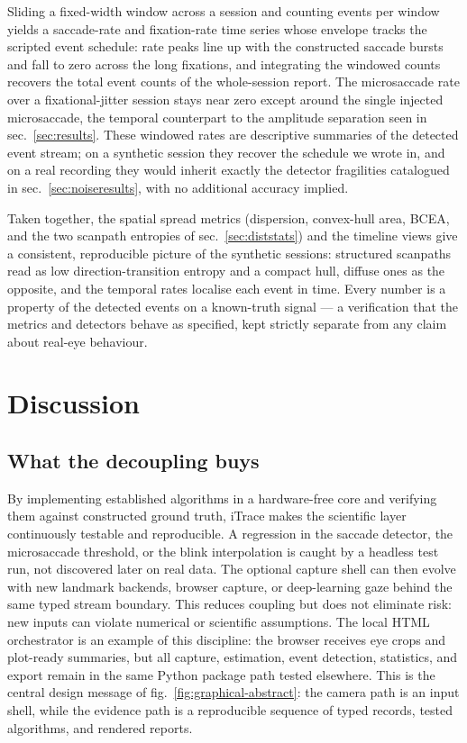 \documentclass[
]{article}
\begin{document}
Sliding a fixed-width window across a session and counting events per
window yields a saccade-rate and fixation-rate time series whose
envelope tracks the scripted event schedule: rate peaks line up with the
constructed saccade bursts and fall to zero across the long fixations,
and integrating the windowed counts recovers the total event counts of
the whole-session report. The microsaccade rate over a fixational-jitter
session stays near zero except around the single injected microsaccade,
the temporal counterpart to the amplitude separation seen in
sec.~\ref{sec:results}. These windowed rates are descriptive summaries
of the detected event stream; on a synthetic session they recover the
schedule we wrote in, and on a real recording they would inherit exactly
the detector fragilities catalogued in sec.~\ref{sec:noiseresults}, with
no additional accuracy implied.

Taken together, the spatial spread metrics (dispersion, convex-hull
area, BCEA, and the two scanpath entropies of sec.~\ref{sec:diststats})
and the timeline views give a consistent, reproducible picture of the
synthetic sessions: structured scanpaths read as low
direction-transition entropy and a compact hull, diffuse ones as the
opposite, and the temporal rates localise each event in time. Every
number is a property of the detected events on a known-truth signal ---
a verification that the metrics and detectors behave as specified, kept
strictly separate from any claim about real-eye behaviour.

\section{Discussion}\label{sec:discussion}

\subsection{What the decoupling buys}\label{what-the-decoupling-buys}

By implementing established algorithms in a hardware-free core and
verifying them against constructed ground truth, iTrace makes the
scientific layer continuously testable and reproducible. A regression in
the saccade detector, the microsaccade threshold, or the blink
interpolation is caught by a headless test run, not discovered later on
real data. The optional capture shell can then evolve with new landmark
backends, browser capture, or deep-learning gaze behind the same typed
stream boundary. This reduces coupling but does not eliminate risk: new
inputs can violate numerical or scientific assumptions. The local HTML
orchestrator is an example of this discipline: the browser receives eye
crops and plot-ready summaries, but all capture, estimation, event
detection, statistics, and export remain in the same Python package path
tested elsewhere. This is the central design message of
fig.~\ref{fig:graphical-abstract}: the camera path is an input shell,
while the evidence path is a reproducible sequence of typed records,
tested algorithms, and rendered reports.
\end{document}

